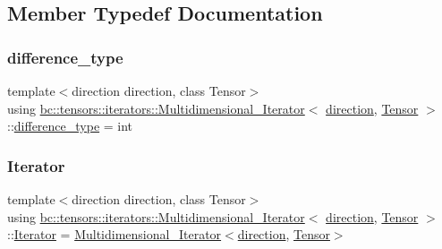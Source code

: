 \subsection{Member Typedef Documentation}
\mbox{\label{structbc_1_1tensors_1_1iterators_1_1Multidimensional__Iterator_a040272bdf9c6d98261ebf0f710dbdd49}} 
\subsubsection{\texorpdfstring{difference\+\_\+type}{difference\_type}}
{\footnotesize\ttfamily template$<$direction direction, class Tensor$>$ \\
using \hyperlink{structbc_1_1tensors_1_1iterators_1_1Multidimensional__Iterator}{bc\+::tensors\+::iterators\+::\+Multidimensional\+\_\+\+Iterator}$<$ \hyperlink{namespacebc_1_1tensors_1_1iterators_ae76efe63fb9cb4985d5e4e6af0ebf296}{direction}, \hyperlink{namespacebc_a659391e47ab612be3ba6c18cf9c89159}{Tensor} $>$\+::\hyperlink{structbc_1_1tensors_1_1iterators_1_1Multidimensional__Iterator_a040272bdf9c6d98261ebf0f710dbdd49}{difference\+\_\+type} =  int}

\mbox{\label{structbc_1_1tensors_1_1iterators_1_1Multidimensional__Iterator_a12d78eb95b3b0fbee7c824f0a79c1513}} 
\subsubsection{\texorpdfstring{Iterator}{Iterator}}
{\footnotesize\ttfamily template$<$direction direction, class Tensor$>$ \\
using \hyperlink{structbc_1_1tensors_1_1iterators_1_1Multidimensional__Iterator}{bc\+::tensors\+::iterators\+::\+Multidimensional\+\_\+\+Iterator}$<$ \hyperlink{namespacebc_1_1tensors_1_1iterators_ae76efe63fb9cb4985d5e4e6af0ebf296}{direction}, \hyperlink{namespacebc_a659391e47ab612be3ba6c18cf9c89159}{Tensor} $>$\+::\hyperlink{structbc_1_1tensors_1_1iterators_1_1Multidimensional__Iterator_a12d78eb95b3b0fbee7c824f0a79c1513}{Iterator} =  \hyperlink{structbc_1_1tensors_1_1iterators_1_1Multidimensional__Iterator}{Multidimensional\+\_\+\+Iterator}$<$\hyperlink{namespacebc_1_1tensors_1_1iterators_ae76efe63fb9cb4985d5e4e6af0ebf296}{direction}, \hyperlink{namespacebc_a659391e47ab612be3ba6c18cf9c89159}{Tensor}$>$}

